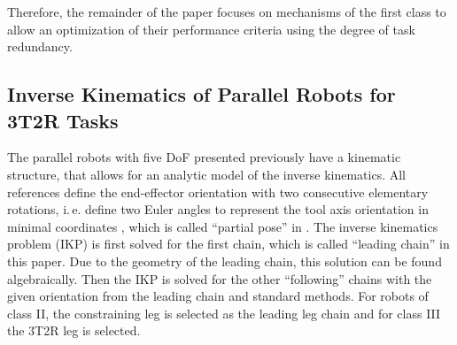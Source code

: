 \documentclass[robotics,article,submit,moreauthors,pdftex]{Definitions/mdpi}
\begin{document}
Therefore, the remainder of the paper focuses on mechanisms of the first class to allow an optimization of their performance criteria using the degree of task redundancy.


\subsection{Inverse Kinematics of Parallel Robots for 3T2R Tasks}

The parallel robots with five DoF presented previously have a kinematic structure, that allows for an analytic model of the inverse kinematics.
All references define the end-effector orientation with two consecutive elementary rotations, i.\,e. define two Euler angles to represent the tool axis orientation in minimal coordinates \cite{LiuXuYaoXu2015, WenQinZhaLam2016, ZhengGaoZha2005,GaoSunZha2004, ChengWanZha2008, AlaghebandMahMilBen2015, Tale-MasoulehSaaGosTag2010, BaerWei2006, Tale-MasoulehGos2011}, which is called ``partial pose'' in \cite{MerletPerDan2000}.
The inverse kinematics problem (IKP) is first solved for the first chain, which is called ``leading chain'' in this paper.
Due to the geometry of the leading chain, this solution can be found algebraically. %
Then the IKP is solved for the other ``following'' chains with the given orientation from the leading chain and standard methods.
For robots of class II, the constraining leg is selected as the leading leg chain and for class III the 3T2R leg is selected. %
\end{document}
